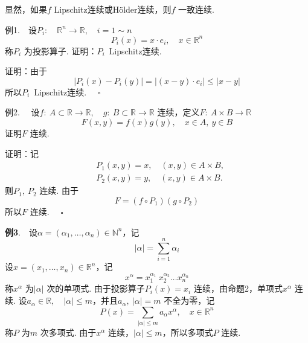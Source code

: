 \documentclass{article}
\begin{document}
显然，如果\(f\) Lipschitz连续或Hölder连续，则\(f\) 一致连续.

\newpage

例1.\ \ 设\(P_i:\quad \mathbb{R}^n \to \mathbb{R},\quad i = 1 \sim n\)
\begin{equation*}
    P_i(x) = x \cdot e_i,\quad x \in \mathbb{R}^n
\end{equation*}
称\(P_i\) 为投影算子. 证明：\(P_i\)\ Lipschitz连续.

\vspace{10pt}

证明：由于
\begin{equation*}
    | P_i(x) - P_i(y) |= | (x - y) \cdot e_i | \le | x - y |
\end{equation*}
所以\(P_i\)\ Lipschitz连续. \(\quad \square\)

\newpage

例2. \ \ 设\(f:\ A \subset \mathbb{R}\to \mathbb{R},\quad g:\ B \subset \mathbb{R}\to \mathbb{R}\) 连续，定义\(F:\ A \times B \to \mathbb{R}\)
\begin{equation*}
    F(x,y) = f(x)g(y),\quad x \in A,\ y \in B
\end{equation*}
证明\(F\) 连续.

\vspace{10pt}

证明：记
\begin{align*}
    & P_1(x,y) = x,\quad (x,y)\in A \times B, \\
    & P_{2}(x,y) = y,\quad (x,y)\in A \times B.
\end{align*}
则\(P_1,\ P_2\) 连续. 由于
\begin{equation*}
    F =(f \circ P_1)(g \circ P_2)
\end{equation*}
所以\(F\) 连续. \(\quad \square\)

\newpage

\textbf{例3}.\ \ 设\(\alpha =(\alpha _{1},\dots ,\alpha _{n})\in \mathbb{N}^{n}\)，记
\begin{equation*}
    | \alpha  |= \sum_{i=1}^n \alpha _{i}
\end{equation*}
设\(x =(x_1,\dots ,x_{n}) \in \mathbb{R}^n\)，记
\begin{equation*}
    x^{\alpha } = x_{1}^{\alpha_{1} }\ x_{2}^{\alpha _{2}}\dots x_{n}^{\alpha _{n}}
\end{equation*}
称\(x^{\alpha }\) 为\(| \alpha  | \) 次的单项式. 由于投影算子\(P_i(x) = x_i\) 连续，由命题2，单项式\(x^{\alpha }\) 连续. 设\(a_{\alpha }\in \mathbb{R},\quad | \alpha  | \le m \)，并且\(a_{\alpha },\ | \alpha  |= m \) 不全为零，记
\begin{equation*}
    P(x) = \sum_{| \alpha| \le m } a_{\alpha }x^{\alpha },\quad x \in \mathbb{R}^n
\end{equation*}
称\(P\) 为\(m\) 次多项式. 由于\(x^{\alpha }\) 连续，\(| \alpha  | \le m \)，所以多项式\(P\) 连续.
\end{document}
